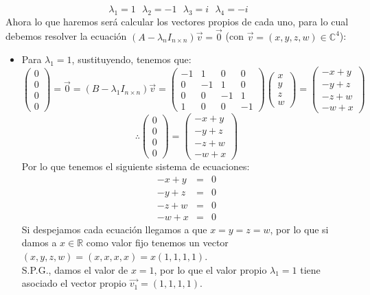 \begin{enumerate}
\[\lambda_1=1~~~\lambda_2=-1~~~\lambda_3=i~~~\lambda_4=-i\]Ahora lo que haremos ser\'a calcular los vectores propios de cada uno, para lo cual debemos resolver la ecuaci\'on $(A-\lambda_nI_{n\times n })\vec{v}=\vec{0}$ (con $\vec{v}=(x,y,z,w)\in\mathbb{C}^4$):
\begin{itemize}
    \item Para $\lambda_1=1$, sustituyendo, tenemos que:
    \[\begin{pmatrix}0\\
0\\0\\0\end{pmatrix}=\vec{0}=(B-\lambda_1I_{n\times n })\vec{v}=\begin{pmatrix}-1&1&0&0\\
0& -1 &1& 0\\
0&0&-1&1\\
1&0&0&-1\end{pmatrix}\begin{pmatrix}x\\
y\\z\\w\end{pmatrix}=\begin{pmatrix}-x+y\\
-y+z\\-z+w\\-w+x\end{pmatrix}\]
\[\therefore \begin{pmatrix}0\\
0\\0\\0\end{pmatrix}=\begin{pmatrix}-x+y\\
-y+z\\-z+w\\-w+x\end{pmatrix}\]
Por lo que tenemos el siguiente sistema de ecuaciones:
\begin{eqnarray*}
-x+y&=&0\\
-y+z&=&0\\-z+w&=&0\\-w+x&=&0
\end{eqnarray*}
Si despejamos cada ecuaci\'on llegamos a que $x=y=z=w$, por lo que si damos a $x\in\mathbb{R}$ como valor fijo tenemos un vector $(x,y,z,w)=(x,x,x,x)=x(1,1,1,1)$.\\
S.P.G., damos el valor de $x=1$, por lo que el valor propio $\lambda_1=1$ tiene asociado el vector propio $\vec{v_1}=(1,1,1,1)$.


\end{itemize}
\end{enumerate}
